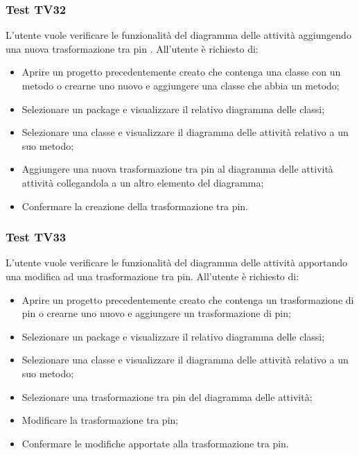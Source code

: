 \documentclass[../PianoDiQualifica.tex]{subfiles}
\begin{document}
	\subsubsection{Test TV32} 
	L'utente vuole verificare le funzionalità del diagramma delle attività aggiungendo una nuova trasformazione tra pin . 
	All'utente è richiesto di: 
	\begin{itemize} 
		\item Aprire un progetto precedentemente creato che contenga una classe con un metodo o crearne uno nuovo e aggiungere una classe che abbia un metodo;
		\item Selezionare un package e visualizzare il relativo diagramma delle classi; 
		\item Selezionare una classe e visualizzare il diagramma delle attività relativo a un suo metodo; %
		\item Aggiungere una nuova trasformazione tra pin al diagramma delle attività attività collegandola a un altro elemento del diagramma; 
		\item Confermare la creazione della trasformazione tra pin.%
	\end{itemize} 
	
	\subsubsection{Test TV33} 
	L'utente vuole verificare le funzionalità del diagramma delle attività apportando una modifica ad una trasformazione tra pin. 
	All'utente è richiesto di: 
	\begin{itemize} 
		\item Aprire un progetto precedentemente creato che contenga un trasformazione di pin o crearne uno nuovo e aggiungere un trasformazione di pin;
		\item Selezionare un package e visualizzare il relativo diagramma delle classi; 
		\item Selezionare una classe e visualizzare il diagramma delle attività relativo a un suo metodo; 
		\item Selezionare una trasformazione tra pin del diagramma delle attività;
		\item Modificare la trasformazione tra pin;%
		\item Confermare le modifiche apportate alla trasformazione tra pin. 
	\end{itemize} 
	
	
\end{document}
